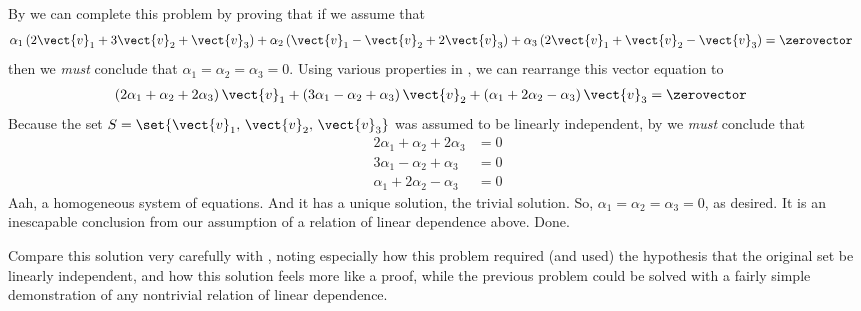 By  we can complete this problem by proving that if we assume that
%
\begin{align*}
\alpha_1\left(2\vect{v}_1+3\vect{v}_2+\vect{v}_3\right)+
\alpha_2\left(\vect{v}_1-\vect{v}_2+2\vect{v}_3\right)+
\alpha_3\left(2\vect{v}_1+\vect{v}_2-\vect{v}_3\right)
&=
\zerovector
\end{align*}
%
then we {\em must} conclude that $\alpha_1=\alpha_2=\alpha_3=0$.
Using various properties in , we can rearrange this vector equation to
%
\begin{align*}
\left(2\alpha_1+\alpha_2+2\alpha_3\right)\vect{v}_1+
\left(3\alpha_1-\alpha_2+\alpha_3\right)\vect{v}_2+
\left(\alpha_1+2\alpha_2-\alpha_3\right)\vect{v}_3
&=
\zerovector
%
\end{align*}
%
Because the set $S=\set{\vect{v}_1,\,\vect{v}_2,\,\vect{v}_3}$ was assumed to be linearly independent, by  we {\em must} conclude that
%
\begin{align*}
2\alpha_1+\alpha_2+2\alpha_3&=0\\
3\alpha_1-\alpha_2+\alpha_3&=0\\
\alpha_1+2\alpha_2-\alpha_3&=0
\end{align*}
%
Aah, a homogeneous system of equations.  And it has a unique solution, the trivial solution.  So, $\alpha_1=\alpha_2=\alpha_3=0$, as desired.  It is an inescapable conclusion from our assumption of a relation of linear dependence above.  Done.\par
%
Compare this solution very carefully with , noting especially how this problem required (and used) the hypothesis that the original set be linearly independent, and how this solution feels more like a proof, while the previous problem could be solved with a fairly simple demonstration of any nontrivial relation of linear dependence.